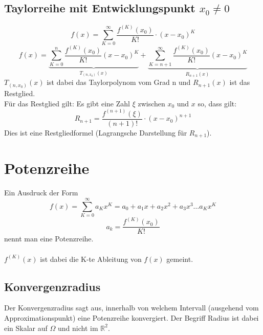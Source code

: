 



\subsection{Taylorreihe mit Entwicklungspunkt $x_0 \neq 0$}
\[ \boxed{f(x) = \sum_{K=0}^{\infty}\frac{f^{(K)}(x_0)}{K!}\cdot (x-x_0)^K} \]
\[ \boxed{f(x) = \underbrace{\sum_{K=0}^{n}\frac{f^{(K)}(x_0)}{K!} (x - x_0)^K}_{T_{(n,x_0)}(x)} + \underbrace{\sum_{K=n+1}^{\infty}\frac{f^{(K)}(x_0)}{K!} (x - x_0)^K}_{R_{n+1}(x)}} \]
$T_{(n,x_0)}(x)$ ist dabei das Taylorpolynom vom Grad n und $R_{n+1}(x)$ ist das Restglied. \\
Für das Restglied gilt: Es gibt eine Zahl $\xi$ zwischen $x_0$ und $x$ so, dass gilt:
\[ \boxed{R_{n+1} = \frac{f^{(n + 1)}(\xi)}{(n + 1)!} \cdot (x - x_0)^{n + 1}} \]
Dies ist eine Restgliedformel (Lagrangsche Darstellung für $R_{n + 1}$).


\section{Potenzreihe}
Ein Ausdruck der Form 
\[ \boxed{f(x) = \sum_{K = 0}^{\infty} a_K x^K = a_0 + a_1 x + a_2 x^2 + a_3 x^3 \dots a_K x^K} \]
\[ \boxed{a_k = \frac{f^{(K)}(x_0)}{K!}} \]
nennt man eine Potenzreihe. \\\\
$f^{(K)}(x)$ ist dabei die K-te Ableitung von $f(x)$ gemeint. 

\subsection{Konvergenzradius}
Der Konvergenzradius sagt aus, innerhalb von welchem Intervall (ausgehend vom Approximationspunkt)
eine Potenzreihe konvergiert. Der Begriff Radius ist dabei ein Skalar auf $\Omega$ und nicht im $\mathbb{R}^2$.

